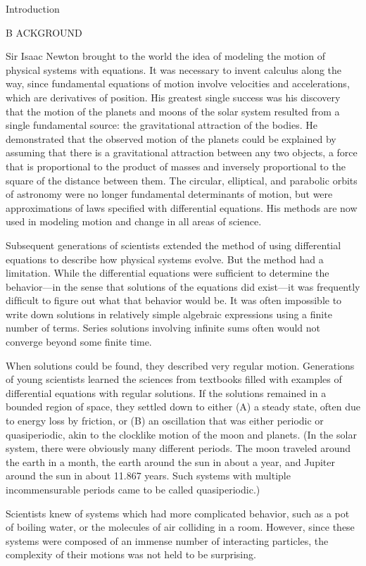 \documentclass[12pt]{article}
\begin{document}
Introduction

B ACKGROUND

Sir Isaac Newton brought to the world the idea of modeling the motion of physical systems with equations. 
It was necessary to invent calculus along the way, since fundamental equations of motion involve velocities 
and accelerations, which are derivatives of position. His greatest single success was his discovery that 
the motion of the planets and moons of the solar system resulted from a single fundamental source: the 
gravitational attraction of the bodies. He demonstrated that the observed motion of the planets could be 
explained by assuming that there is a gravitational attraction between any two objects, a force that is 
proportional to the product of masses and inversely proportional to the square of the distance between 
them. The circular, elliptical, and parabolic orbits of astronomy were no longer fundamental determinants 
of motion, but were approximations of laws speciﬁed with differential 
equations. His methods are now used in modeling motion and change in all areas of science.

Subsequent generations of scientists extended the method of using differential equations to describe how 
physical systems evolve. But the method had a limitation. While the differential equations were sufﬁcient 
to determine the behavior—in the sense that solutions of the equations did exist—it was frequently 
difﬁcult to ﬁgure out what that behavior would be. It was often impossible to write down solutions in 
relatively simple algebraic expressions using a ﬁnite number of terms. Series solutions involving inﬁnite 
sums often would not converge beyond some ﬁnite time.

When solutions could be found, they described very regular motion. Generations of young scientists learned 
the sciences from textbooks ﬁlled with examples of differential equations with regular solutions. If the 
solutions remained in a bounded region of space, they settled down to either (A) a steady state, often due 
to energy loss by friction, or (B) an oscillation that was either periodic or quasiperiodic, akin to the 
clocklike motion of the moon and planets. (In the solar system, there were obviously many different 
periods. The moon traveled around the earth in a month, the earth around the sun in about a year, and 
Jupiter around the sun in about 11.867 years. Such systems with multiple incommensurable periods came to be 
called quasiperiodic.)

Scientists knew of systems which had more complicated behavior, such as a pot of boiling water, or the 
molecules of air colliding in a room. However, since these systems were composed of an immense number of 
interacting particles, the complexity of their motions was not held to be surprising.
\end{document}
